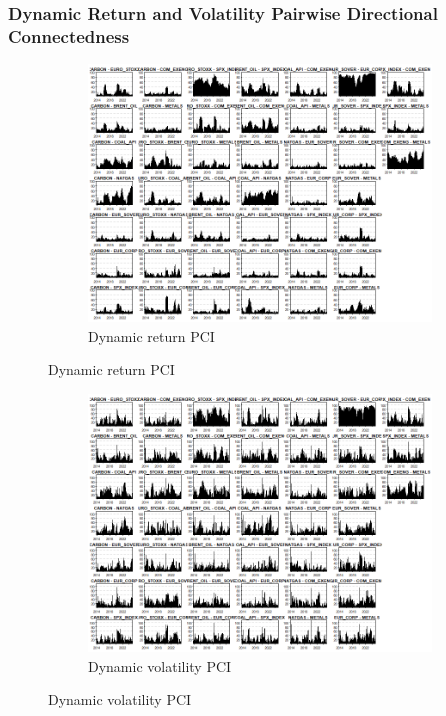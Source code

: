 \documentclass[preprint, 3p,
authoryear]{elsarticle} %
\begin{document}
\begin{landscape}
\newpage

\subsubsection{Dynamic Return and Volatility Pairwise Directional Connectedness}

\begin{figure}[!ht]
  \caption{Dynamic Return and Volatility Pairwise Connectedness Index (Jan 2013 – Jan 2025)}
  \centering
  \begin{subfigure}[a]{\textwidth}
    \caption{Dynamic return PCI}
    \includegraphics[width = 1.1\linewidth]{10aApdxD-10-180-RetPCI}
  \end{subfigure}
\end{figure}
\begin{figure}[!ht]
  \ContinuedFloat
  \centering
    \begin{subfigure}[b]{\textwidth}\ContinuedFloat
      \caption{Dynamic volatility PCI}
      \includegraphics[width = 1.2\linewidth]{10bApdxD-10-180-VolPCI}
    \end{subfigure}
\end{figure}






\end{landscape}
\end{document}
